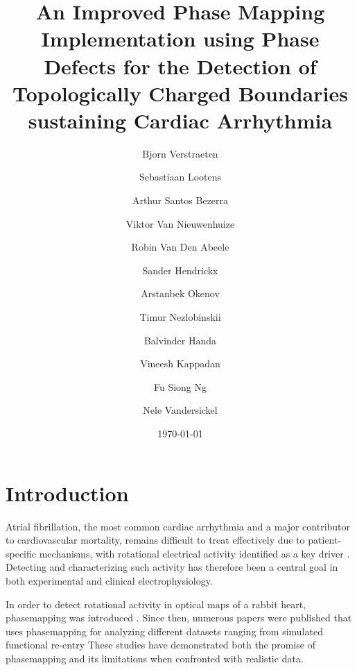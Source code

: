 \documentclass[twocolumn]{article}
\title{An Improved Phase Mapping Implementation using Phase Defects for the Detection of Topologically Charged Boundaries sustaining Cardiac Arrhythmia}
\author[1]{Bjorn Verstraeten}
\author[1]{Sebastiaan Lootens}
\author[1]{Arthur Santos Bezerra}
\author[1]{Viktor Van Nieuwenhuize}
\author[1]{Robin Van Den Abeele}
\author[1]{Sander Hendrickx}
\author[1]{Arstanbek Okenov}
\author[1]{Timur Nezlobinskii}
\author[2]{Balvinder Handa}
\author[2]{Vineesh Kappadan}
\author[2]{Fu Siong Ng}
\author[1]{Nele Vandersickel}
\affil[1]{Department of Physics and Astronomy, Ghent University, Ghent, Belgium}
\affil[2]{Imperial College London, London, United Kingdom}
\date{\today}
\begin{document}

\section{Introduction}

Atrial fibrillation, the most common cardiac arrhythmia and a major contributor to cardiovascular mortality,
remains difficult to treat effectively due to patient-specific mechanisms,
with rotational electrical activity identified as a key driver \cite{worldbankWorldBank, Brundel2022, 1994theoretical_hypothesis_scrollwaves_fibrillation_winfree}.
Detecting and characterizing such activity has therefore been a central goal in both experimental and clinical electrophysiology.

In order to detect rotational activity in optical maps of a rabbit heart,
phasemapping was introduced \cite{1995experimental_rabbit_fibrillation_gray}.
Since then, numerous papers were published that uses phasemapping for analyzing different datasets
ranging from simulated functional re-entry \cite{2018simulation_benchmark_wavelength_fibrosis_roney, 2024simulation_benchmark_fibrosis_meandering_noise_lootens}
These studies have demonstrated both the promise of phasemapping
and its limitations when confronted with realistic data.
\end{document}
